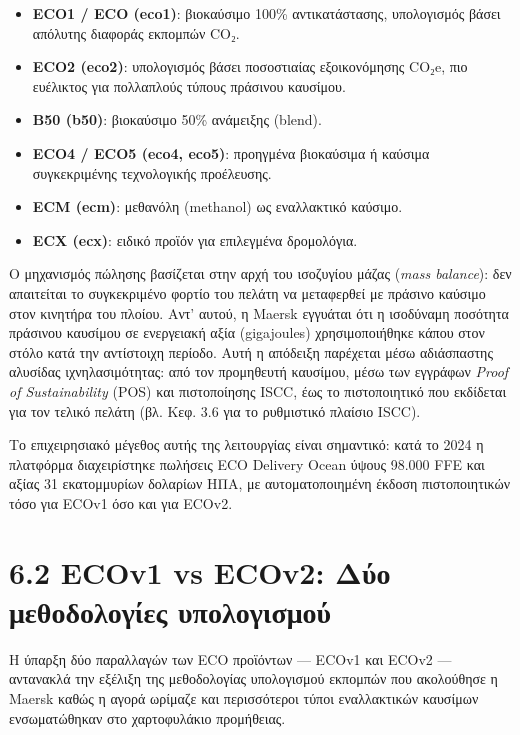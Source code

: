 \documentclass[11pt,a4paper,greek,twoside]{template-xe}
\providecommand{\tightlist}{\setlength{\itemsep}{0pt}\setlength{\parskip}{0pt}}
\begin{document}
\begin{itemize}
\tightlist
\item
  \textbf{ECO1 / ECO (eco1)}: βιοκαύσιμο 100\% αντικατάστασης,
  υπολογισμός βάσει απόλυτης διαφοράς εκπομπών CO₂.
\item
  \textbf{ECO2 (eco2)}: υπολογισμός βάσει ποσοστιαίας εξοικονόμησης
  CO₂e, πιο ευέλικτος για πολλαπλούς τύπους πράσινου καυσίμου.
\item
  \textbf{B50 (b50)}: βιοκαύσιμο 50\% ανάμειξης (blend).
\item
  \textbf{ECO4 / ECO5 (eco4, eco5)}: προηγμένα βιοκαύσιμα ή καύσιμα
  συγκεκριμένης τεχνολογικής προέλευσης.
\item
  \textbf{ECM (ecm)}: μεθανόλη (methanol) ως εναλλακτικό καύσιμο.
\item
  \textbf{ECX (ecx)}: ειδικό προϊόν για επιλεγμένα δρομολόγια.
\end{itemize}

Ο μηχανισμός πώλησης βασίζεται στην αρχή του ισοζυγίου μάζας (\emph{mass
balance}): δεν απαιτείται το συγκεκριμένο φορτίο του πελάτη να
μεταφερθεί με πράσινο καύσιμο στον κινητήρα του πλοίου. Αντ' αυτού, η
Maersk εγγυάται ότι η ισοδύναμη ποσότητα πράσινου καυσίμου σε ενεργειακή
αξία (gigajoules) χρησιμοποιήθηκε κάπου στον στόλο κατά την αντίστοιχη
περίοδο. Αυτή η απόδειξη παρέχεται μέσω αδιάσπαστης αλυσίδας
ιχνηλασιμότητας: από τον προμηθευτή καυσίμου, μέσω των εγγράφων
\emph{Proof of Sustainability} (POS) και πιστοποίησης ISCC, έως το
πιστοποιητικό που εκδίδεται για τον τελικό πελάτη (βλ. Κεφ. 3.6 για το
ρυθμιστικό πλαίσιο ISCC).

Το επιχειρησιακό μέγεθος αυτής της λειτουργίας είναι σημαντικό: κατά το
2024 η πλατφόρμα διαχειρίστηκε πωλήσεις ECO Delivery Ocean ύψους 98.000
FFE και αξίας 31 εκατομμυρίων δολαρίων ΗΠΑ, με αυτοματοποιημένη έκδοση
πιστοποιητικών τόσο για ECOv1 όσο και για ECOv2.

\section{6.2 ECOv1 vs ECOv2: Δύο μεθοδολογίες
υπολογισμού}\label{ecov1-vs-ecov2-ux3b4ux3cdux3bf-ux3bcux3b5ux3b8ux3bfux3b4ux3bfux3bbux3bfux3b3ux3afux3b5ux3c2-ux3c5ux3c0ux3bfux3bbux3bfux3b3ux3b9ux3c3ux3bcux3bfux3cd}

Η ύπαρξη δύο παραλλαγών των ECO προϊόντων --- ECOv1 και ECOv2 ---
αντανακλά την εξέλιξη της μεθοδολογίας υπολογισμού εκπομπών που
ακολούθησε η Maersk καθώς η αγορά ωρίμαζε και περισσότεροι τύποι
εναλλακτικών καυσίμων ενσωματώθηκαν στο χαρτοφυλάκιο προμήθειας.
\end{document}
